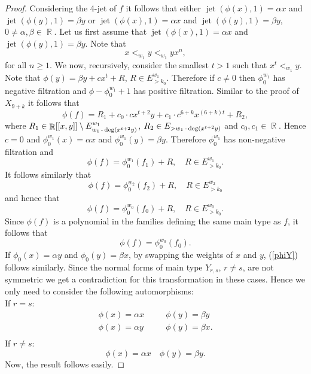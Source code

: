 \documentclass[noend]{amsproc}
\theoremstyle{definition}
\DeclareMathOperator{\jet}{jet}
\DeclareMathOperator{\R}{\mathbb{R}}
\DeclareMathOperator{\dash}{\textnormal{-}}
\begin{document}
\begin{proof}
Considering the 4-jet of $f$ it follows that either $\jet(\phi(x),1)=\alpha x$ and $\jet(\phi(y),1)=\beta y$ or $\jet(\phi(x),1)=\alpha x$ and $\jet(\phi(y),1)=\beta y$, $0\neq \alpha,\beta\in\R$. Let us first assume that $\jet(\phi(x),1)=\alpha x$ and $\jet(\phi(y),1)=\beta y$.
Note that
\begin{equation*}
x<_{w_1}y<_{w_1}yx^n,
\end{equation*}
for all $n\ge 1$. We now, recursively, consider the smallest $t>1$ such that $x^t<_{w_1}y$. Note that $\phi(y)=\beta y+c x^t+R$, $R\in E^{w_1}_{>k_0}$. Therefore if $c\neq 0$ then $\phi_0^{w_1}$ has negative filtration and $\phi-\phi_0^{w_1}+1$ has positive filtration. Similar to the proof of $X_{9+k}$ it follows that
\begin{equation*}
\phi(f)=R_1+c_0\cdot cx^{t+2}y+c_1\cdot c^{6+k}x^{(6+k)t}+R_2,
\end{equation*}
where $R_1\in\R[[x,y]]\setminus E^{w_1}_{w_1\dash\deg(x^{t+2}y)}$, $R_2\in E_{>w_1\dash\deg(x^{t+2}y)}$ and $c_0,c_1\in\R$. Hence $c=0$ and $\phi_0^{w_1}(x)=\alpha x$ and $\phi_0^{w_1}(y)=\beta y$. Therefore $\phi_0^{w_1}$ has non-negative filtration and
\begin{equation*}
\phi(f)=\phi_0^{w_1}(f_1)+R, \quad R\in E_{>k_0}^{w_1}.
\end{equation*}
It follows similarly that
\begin{equation*}
\phi(f)=\phi_0^{w_2}(f_2)+R,\quad R\in E_{> k_0}^{w_2}
\end{equation*}
and hence that
\begin{equation*}
\phi(f)=\phi_0^{w_0}(f_0)+R,\quad R\in E^{w_0}_{> k_0}.
\end{equation*}
Since $\phi(f)$ is a polynomial in the families defining the same main type as $f$, it follows that
\begin{equation}\label{phiY}
\phi(f)=\phi_0^{w_0}(f_0).
\end{equation}
If $\phi_0(x)=\alpha y$ and $\phi_0(y)=\beta x$, by swapping the weights of $x$ and $y$, (\ref{phiY}) follows similarly. Since the normal forms of main type $Y_{r,s}$, $r\neq s$, are not symmetric we get a contradiction for this transformation in these cases. Hence we only need to consider the following automorphisms:\\
If $r=s$:
\begin{eqnarray*}
\phi(x)=\alpha x&\quad&\phi(y)=\beta y\\
\phi(x)=\alpha y&\quad&\phi(y)=\beta x.\\
\end{eqnarray*}
If $r\neq s$:
\begin{equation*}
\phi(x)=\alpha x\quad\phi(y)=\beta y.
\end{equation*}
Now, the result follows easily.
\end{proof}
\end{document}
